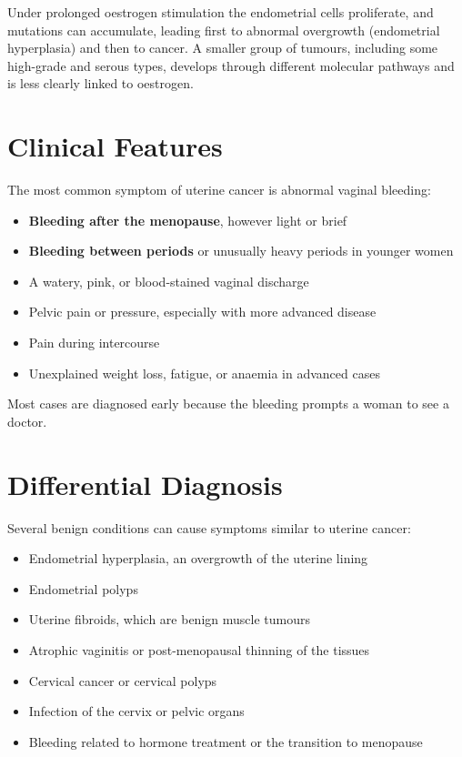 Under prolonged oestrogen stimulation the endometrial cells proliferate, and mutations can accumulate, leading first to abnormal overgrowth (endometrial hyperplasia) and then to cancer. A smaller group of tumours, including some high-grade and serous types, develops through different molecular pathways and is less clearly linked to oestrogen.

\section*{Clinical Features}
The most common symptom of uterine cancer is abnormal vaginal bleeding:
\begin{itemize}
    \item \textbf{Bleeding after the menopause}, however light or brief
    \item \textbf{Bleeding between periods} or unusually heavy periods in younger women
    \item A watery, pink, or blood-stained vaginal discharge
    \item Pelvic pain or pressure, especially with more advanced disease
    \item Pain during intercourse
    \item Unexplained weight loss, fatigue, or anaemia in advanced cases
\end{itemize}

Most cases are diagnosed early because the bleeding prompts a woman to see a doctor.

\section*{Differential Diagnosis}
Several benign conditions can cause symptoms similar to uterine cancer:
\begin{itemize}
    \item Endometrial hyperplasia, an overgrowth of the uterine lining
    \item Endometrial polyps
    \item Uterine fibroids, which are benign muscle tumours
    \item Atrophic vaginitis or post-menopausal thinning of the tissues
    \item Cervical cancer or cervical polyps
    \item Infection of the cervix or pelvic organs
    \item Bleeding related to hormone treatment or the transition to menopause
\end{itemize}

